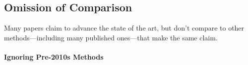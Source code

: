 
\subsection{Omission of Comparison}

Many papers claim to advance the state of the art, but don't compare to other methods---including many published ones---that make the same claim. %


\vspace{-2mm}
\paragraph{Ignoring Pre-2010s Methods}

